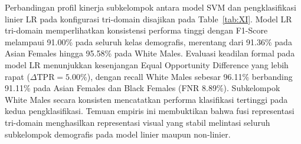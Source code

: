 Perbandingan profil kinerja subkelompok antara model SVM dan pengklasifikasi linier LR pada konfigurasi tri-domain disajikan pada Table~\ref{tab:XI}. Model LR tri-domain memperlihatkan konsistensi performa tinggi dengan F1-Score melampaui 91.00\% pada seluruh kelas demografis, merentang dari 91.36\% pada Asian Females hingga 95.58\% pada White Males. Evaluasi keadilan formal pada model LR menunjukkan kesenjangan Equal Opportunity Difference yang lebih rapat ($\Delta\text{TPR} = 5.00\%$), dengan recall White Males sebesar 96.11\% berbanding 91.11\% pada Asian Females dan Black Females (FNR 8.89\%). Subkelompok White Males secara konsisten mencatatkan performa klasifikasi tertinggi pada kedua pengklasifikasi. Temuan empiris ini membuktikan bahwa fusi representasi tri-domain menghasilkan representasi visual yang stabil melintasi seluruh subkelompok demografis pada model linier maupun non-linier.
